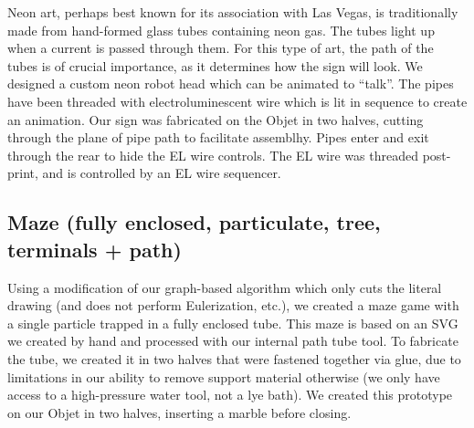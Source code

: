 Neon art, perhaps best known for its association with Las Vegas, is traditionally made from hand-formed glass tubes containing neon gas.  The tubes light up when a current is passed through them.  For this type of art, the path of the tubes is of crucial importance, as it determines how the sign will look.  We designed a custom neon robot head which can be animated to ``talk''.  The pipes have been threaded with electroluminescent wire which is lit in sequence to create an animation.  Our sign was fabricated on the Objet in two halves, cutting through the plane of pipe path to facilitate assemblhy. Pipes enter and exit through the rear to hide the EL wire controls.  The EL wire was threaded post-print, and is controlled by an EL wire sequencer.

\subsection{Maze (fully enclosed, particulate, tree, terminals + path)}

Using a modification of our graph-based algorithm which only cuts the literal drawing (and does not perform Eulerization, etc.), we created a maze game with a single particle trapped in a fully enclosed tube.  This maze is based on an SVG we created by hand and processed with our internal path tube tool.  To fabricate the tube, we created it in two halves that were fastened together via glue, due to limitations in our ability to remove support material otherwise (we only have access to a high-pressure water tool, not a lye bath).  We created this prototype on our Objet in two halves, inserting a marble before closing. 